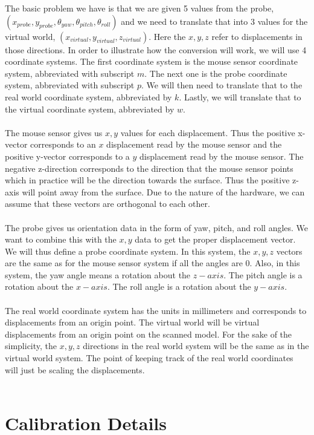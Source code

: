 \documentclass[11pt,psfig]{article}
\begin{document}
The basic problem we have is that we are given 5 values from the probe, $(x_{probe},y_{probe},\theta_{yaw},\theta_{pitch},\theta_{roll})$ and we need to translate that into 3 values for the virtual world, $(x_{virtual},y_{virtual},z_{virtual})$. Here the $x,y,z$ refer to displacements in those directions. In order to illustrate how the conversion will work, we will use 4 coordinate systems. The first coordinate system is the mouse sensor coordinate system, abbreviated with subscript $m$. The next one is the probe coordinate system, abbreviated with subscript $p$. We will then need to translate that to the real world coordinate system, abbreviated by $k$. Lastly, we will translate that to the virtual coordinate system, abbreviated by $w$.\\
\\
The mouse sensor gives us $x,y$ values for each displacement. Thus the positive x-vector corresponds to an $x$ displacement read by the mouse sensor and the positive y-vector corresponds to a $y$ displacement read by the mouse sensor. The negative z-direction corresponds to the direction that the mouse sensor points which in practice will be the direction towards the surface. Thus the positive z-axis will point away from the surface. Due to the nature of the hardware, we can assume that these vectors are orthogonal to each other.\\
\\
The probe gives us orientation data in the form of yaw, pitch, and roll angles. We want to combine this with the $x,y$ data to get the proper displacement vector. We will thus define a probe coordinate system. In this system, the $x,y,z$ vectors are the same as for the mouse sensor system if all the angles are $0$. Also, in this system, the yaw angle means a rotation about the $z-axis$. The pitch angle is a rotation about the $x-axis$. The roll angle is a rotation about the $y-axis$. \\
\\
The real world coordinate system has the units in millimeters and corresponds to displacements from an origin point. The virtual world will be virtual displacements from an origin point on the scanned model. For the sake of the simplicity, the $x,y,z$ directions in the real world system will be the same as in the virtual world system. The point of keeping track of the real world coordinates will just be scaling the displacements. \\
\\


\section*{Calibration Details}
\end{document}
